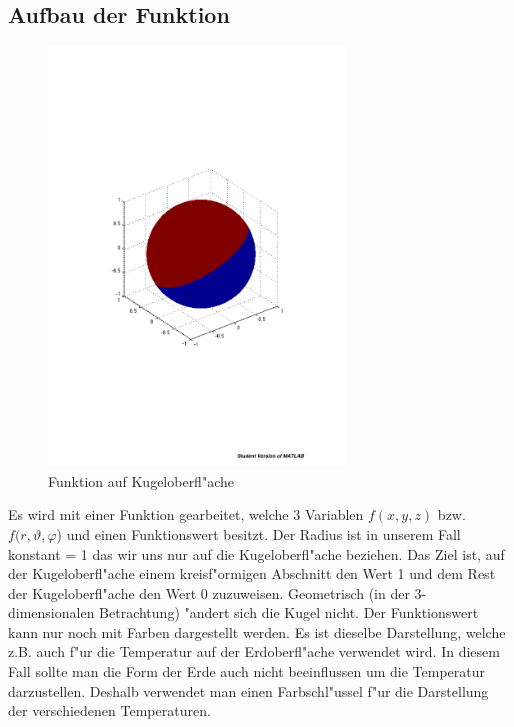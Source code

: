\begin{refsection}
 
\section{Aufbau der Funktion}

\begin{figure}%
\centering
\includegraphics[width=0.7\textwidth]{kugel/Funktion.pdf}
\caption{Funktion auf Kugeloberfl"ache
\label{skript:Funktion auf Kugeloberfl"ache}}
\end{figure}

Es wird mit einer Funktion gearbeitet, welche 3 Variablen $f(x,y,z)$ bzw. $f(r,\vartheta,\varphi$) und einen Funktionswert besitzt. Der Radius ist in unserem Fall konstant = 1 das wir uns nur auf die Kugeloberfl"ache beziehen. Das Ziel ist, auf der Kugeloberfl"ache einem kreisf"ormigen Abschnitt den Wert 1 und dem Rest der Kugeloberfl"ache den Wert 0 zuzuweisen. Geometrisch (in der 3-dimensionalen Betrachtung) "andert sich die Kugel nicht. Der Funktionswert kann nur noch mit Farben dargestellt werden. Es ist dieselbe Darstellung, welche z.B. auch f"ur die Temperatur auf der Erdoberfl"ache verwendet wird. In diesem Fall sollte man die Form der Erde auch nicht beeinflussen um die Temperatur darzustellen. Deshalb verwendet man einen Farbschl"ussel f"ur die Darstellung der verschiedenen Temperaturen.\\


\end{refsection}
